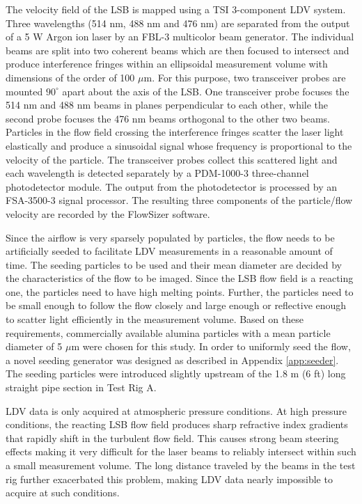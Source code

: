 The velocity field of the LSB is mapped using a TSI 3-component LDV system.
Three wavelengths (514 nm, 488 nm and 476 nm) are separated from the output of a 5 W Argon ion laser by an FBL-3 multicolor beam generator.
The individual beams are split into two coherent beams which are then focused to intersect and produce interference fringes within an ellipsoidal measurement volume with dimensions of the order of 100 \(\mu\)m.
For this purpose, two transceiver probes are mounted \(90^\circ\) apart about the axis of the LSB.
One transceiver probe focuses the 514 nm and 488 nm beams in planes perpendicular to each other, while the second probe focuses the 476 nm beams orthogonal to the other two beams.
Particles in the flow field crossing the interference fringes scatter the laser light elastically and produce a sinusoidal signal whose frequency is proportional to the velocity of the particle.
The transceiver probes collect this scattered light and each wavelength is detected separately by a PDM-1000-3 three-channel photodetector module.
The output from the photodetector is processed by an FSA-3500-3 signal processor.
The resulting three components of the particle/flow velocity are recorded by the FlowSizer software.

Since the airflow is very sparsely populated by particles, the flow needs to be artificially seeded to facilitate LDV measurements in a reasonable amount of time.
The seeding particles to be used and their mean diameter are decided by the characteristics of the flow to be imaged.\cite{1997-melling}
Since the LSB flow field is a reacting one, the particles need to have high melting points.
Further, the particles need to be small enough to follow the flow closely and large enough or reflective enough to scatter light efficiently in the measurement volume.
Based on these requirements, commercially available alumina particles with a mean particle diameter of 5 \(\mu\)m were chosen for this study.
In order to uniformly seed the flow, a novel seeding generator was designed as described in Appendix \ref{app:seeder}.
The seeding particles were introduced slightly upstream of the 1.8 m (6 ft) long straight pipe section in Test Rig A.

LDV data is only acquired at atmospheric pressure conditions.
At high pressure conditions, the reacting LSB flow field produces sharp refractive index gradients that rapidly shift in the turbulent flow field.
This causes strong beam steering effects making it very difficult for the laser beams to reliably intersect within such a small measurement volume.
The long distance traveled by the beams in the test rig further exacerbated this problem, making LDV data nearly impossible to acquire at such conditions.

